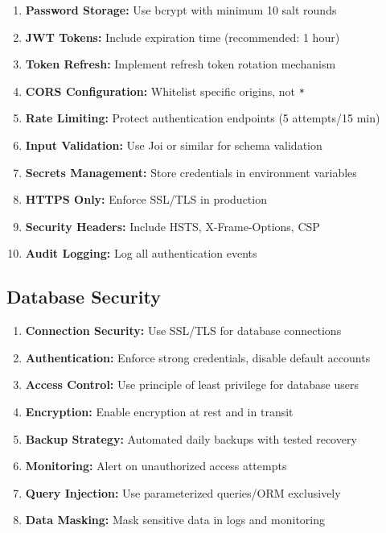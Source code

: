 \begin{enumerate}
    \item \textbf{Password Storage:} Use bcrypt with minimum 10 salt rounds
    \item \textbf{JWT Tokens:} Include expiration time (recommended: 1 hour)
    \item \textbf{Token Refresh:} Implement refresh token rotation mechanism
    \item \textbf{CORS Configuration:} Whitelist specific origins, not \texttt{*}
    \item \textbf{Rate Limiting:} Protect authentication endpoints (5 attempts/15 min)
    \item \textbf{Input Validation:} Use Joi or similar for schema validation
    \item \textbf{Secrets Management:} Store credentials in environment variables
    \item \textbf{HTTPS Only:} Enforce SSL/TLS in production
    \item \textbf{Security Headers:} Include HSTS, X-Frame-Options, CSP
    \item \textbf{Audit Logging:} Log all authentication events
\end{enumerate}

\subsection{Database Security}

\begin{enumerate}
    \item \textbf{Connection Security:} Use SSL/TLS for database connections
    \item \textbf{Authentication:} Enforce strong credentials, disable default accounts
    \item \textbf{Access Control:} Use principle of least privilege for database users
    \item \textbf{Encryption:} Enable encryption at rest and in transit
    \item \textbf{Backup Strategy:} Automated daily backups with tested recovery
    \item \textbf{Monitoring:} Alert on unauthorized access attempts
    \item \textbf{Query Injection:} Use parameterized queries/ORM exclusively
    \item \textbf{Data Masking:} Mask sensitive data in logs and monitoring
\end{enumerate}

